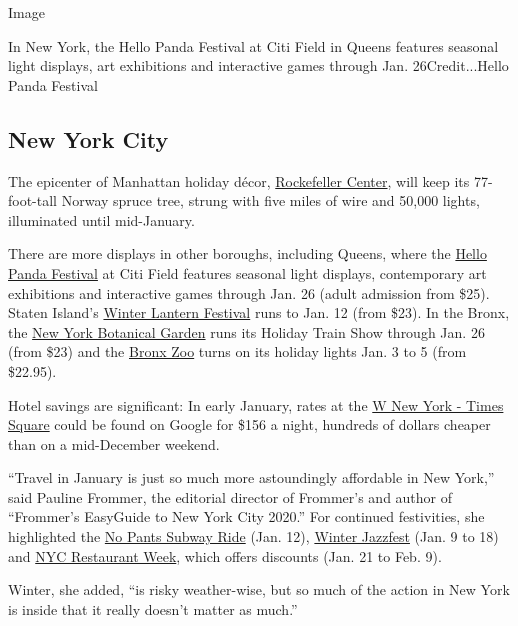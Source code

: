 Image

In New York, the Hello Panda Festival at Citi Field in Queens features
seasonal light displays, art exhibitions and interactive games through
Jan. 26Credit...Hello Panda Festival

\hypertarget{new-york-city}{%
\subsection{New York City}\label{new-york-city}}

The epicenter of Manhattan holiday décor,
\href{https://www.rockefellercenter.com/holidays/}{Rockefeller Center},
will keep its 77-foot-tall Norway spruce tree, strung with five miles of
wire and 50,000 lights, illuminated until mid-January.

There are more displays in other boroughs, including Queens, where the
\href{http://www.hellopandafest.com/}{Hello Panda Festival} at Citi
Field features seasonal light displays, contemporary art exhibitions and
interactive games through Jan. 26 (adult admission from \$25). Staten
Island's \href{https://www.nycwinterlanternfestival.com/}{Winter Lantern
Festival} runs to Jan. 12 (from \$23). In the Bronx, the
\href{https://www.nybg.org/event/holiday-train-show/}{New York Botanical
Garden} runs its Holiday Train Show through Jan. 26 (from \$23) and the
\href{https://bronxzoo.com/holiday-lights}{Bronx Zoo} turns on its
holiday lights Jan. 3 to 5 (from \$22.95).

Hotel savings are significant: In early January, rates at the
\href{https://www.whotelsnewyork.com/property/w-new-york-times-square/}{W
New York - Times Square} could be found on Google for \$156 a night,
hundreds of dollars cheaper than on a mid-December weekend.

``Travel in January is just so much more astoundingly affordable in New
York,'' said Pauline Frommer, the editorial director of Frommer's and
author of ``Frommer's EasyGuide to New York City 2020.'' For continued
festivities, she highlighted the
\href{https://improveverywhere.com/2019/12/02/save-the-date-no-pants-subway-ride-2020/}{No
Pants Subway Ride} (Jan. 12),
\href{https://www.winterjazzfest.com/}{Winter Jazzfest} (Jan. 9 to 18)
and \href{https://www.nycgo.com/restaurant-week/}{NYC Restaurant Week},
which offers discounts (Jan. 21 to Feb. 9).

Winter, she added, ``is risky weather-wise, but so much of the action in
New York is inside that it really doesn't matter as much.''

